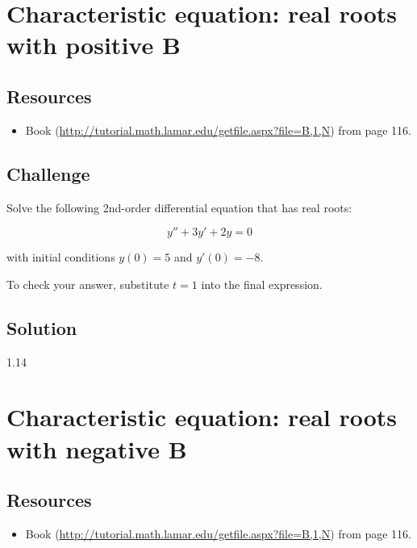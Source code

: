 \newpage
\section{Characteristic equation: real roots with positive B}

\subsection*{Resources}
\begin{itemize}
    \item Book (\url{http://tutorial.math.lamar.edu/getfile.aspx?file=B,1,N}) from page 116.
\end{itemize}

\subsection*{Challenge}
Solve the following 2nd-order differential equation that has real roots:

\begin{equation}
    \label{eq:ccrrpb}
    y'' + 3 y' + 2 y = 0
\end{equation}

with initial conditions $y(0)=5$ and $y'(0)=-8$.

To check your answer, substitute $t=1$ into the final expression.


\subsection*{Solution}
1.14 %




\newpage
\section{Characteristic equation: real roots with negative B}

\subsection*{Resources}
\begin{itemize}
    \item Book (\url{http://tutorial.math.lamar.edu/getfile.aspx?file=B,1,N}) from page 116.
\end{itemize}

